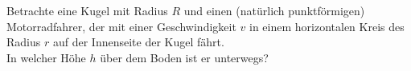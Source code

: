 \begin{Exercise}[label = Motorrad in der Kugel, origin = Maximilian Marienhagen, difficulty = 2, title = Motorrad in der Kugel]
Betrachte eine Kugel mit Radius $R$ und einen (natürlich punktförmigen) Motorradfahrer, der mit einer Geschwindigkeit $v$ in einem horizontalen Kreis des Radius $r$ auf der Innenseite der Kugel fährt.\\ In welcher Höhe $h$ über dem Boden ist er unterwegs?
\end{Exercise}